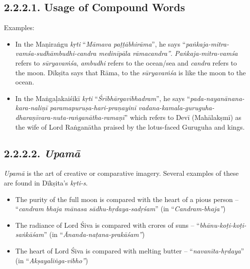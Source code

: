 \subsection*{2.2.2.1. Usage of Compound Words}

Examples:

\begin{itemize}

 \item In the Maṇiraṅgu \textit{kṛti} “\textit{Māmava paṭṭābhirāma}”, he says “\textit{paṅkaja-mitra-vamśa-sudhāmbudhi-candra medinīpāla rāmacandra”}. \textit{Paṅkaja-mitra-vamśa} refers to \textit{sūryavaṁśa}, \textit{ambudhi} refers to the ocean/sea and \textit{ candra} refers to the moon. Dīkṣita says that Rāma, to the \textit{sūryavaṁśa} is like the moon to the ocean.

 \item In the Maṅgaḷakaiśikī \textit{kṛti} “\textit{Śrībhārgavībhadram}”, he says “\textit{pada-nayanānana-kara-naliṇī paramapuruṣa-hari-praṇayinī vadana-kam\-ala-guruguha-dharaṇīvara-nuta-raṅganātha-ramaṇī}” which refers to Devī (Mahālakṣmī) as the wife of Lord Raṅganātha praised by the lotus-faced Guruguha and kings.

\end{itemize}


\subsection*{2.2.2.2. \textit{Upamā}}

\textit{Upamā} is the art of creative or comparative imagery. Several examples of these are found in Dīkṣita’s \textit{kṛti-s}.

\begin{itemize}
\itemsep=0pt

 \item The purity of the full moon is compared with the heart of a pious person – “\textit{candram bhaja mānasa sādhu-hṛdaya-sadṛśam}” (in “\textit{Candram-bhaja”})

 \item The radiance of Lord Śiva is compared with crores of suns – “\textit{bhānu-koṭi-koṭi-saṅkāśam}” (in “\textit{Ānanda-naṭana-prakāśam”})

 \item The heart of Lord Śiva is compared with melting butter – “\textit{navanīta-hṛdaya}” (in “\textit{Akṣayaliṅga-vibho”})

\end{itemize}

